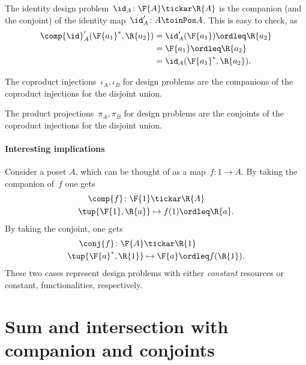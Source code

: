 \begin{example}The identity design problem~$\id_A\colon \F{A} \tickar \R{A}$ is the companion (and the conjoint) of the identity map~$\id_A'\colon A \toinPos A$. This is easy to check, as
\begin{equation}
    \begin{aligned}
    \comp{\id}_A'(\F{a_1}^*,\R{a_2})&=\id_A'(\F{a_1})\ordleq \R{a_2}\\
    &=\F{a_1}\ordleq \R{a_2}\\
    &=\id_A(\F{a_1}^*,\R{a_2}).
    \end{aligned}
\end{equation}
\end{example}

\begin{example}The coproduct injections~$\iota_A, \iota_B$ for design problems are the companions of the coproduct injections for the disjoint union.
\end{example}

\begin{example}The product projections~$\pi_A, \pi_B$ for design problems are the conjoints of the coproduct injections for the disjoint union.
\end{example}


\paragraph{Interesting implications}
Consider a poset $A$, which can be thought of as a map~$f\colon 1\to A$. By taking the companion of~$f$ one gets
\begin{equation}
\begin{aligned}
    \comp{f}\colon \F{1}&\tickar \R{A}\\
    \tup{\F{1},\R{a}}&\mapsto f(1)\ordleq \R{a}.
\end{aligned}
\end{equation}
By taking the conjoint, one gets
\begin{equation}
\begin{aligned}
    \conj{f}\colon \F{A}&\tickar \R{1}\\
    \tup{\F{a}^*,\R{1}}&\mapsto \F{a}\ordleq f(\R{1}).
\end{aligned}
\end{equation}
These two cases represent design problems with either \emph{constant} resources or constant, functionalities, respectively.


\section{Sum and intersection with companion and conjoints}

